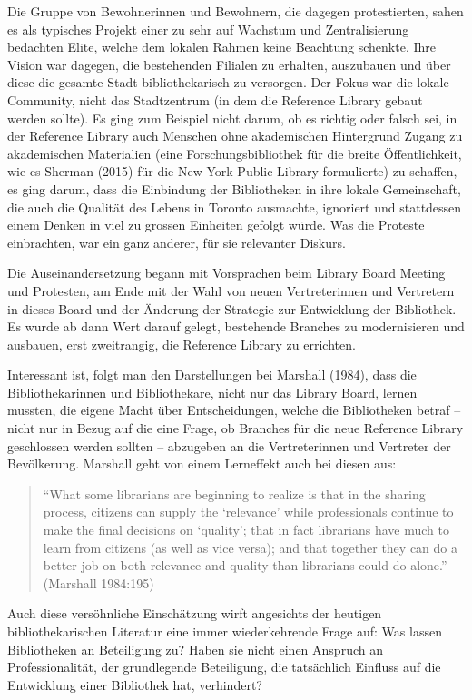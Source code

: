 \documentclass[a4paper,
fontsize=11pt,
oneside,
numbers=noperiodatend,
parskip=half-,
bibliography=totoc,
final
]{scrartcl}
\begin{document}
Die Gruppe von Bewohnerinnen und Bewohnern, die dagegen protestierten,
sahen es als typisches Projekt einer zu sehr auf Wachstum und
Zentralisierung bedachten Elite, welche dem lokalen Rahmen keine
Beachtung schenkte. Ihre Vision war dagegen, die bestehenden Filialen zu
erhalten, auszubauen und über diese die gesamte Stadt bibliothekarisch
zu versorgen. Der Fokus war die lokale Community, nicht das Stadtzentrum
(in dem die Reference Library gebaut werden sollte). Es ging zum
Beispiel nicht darum, ob es richtig oder falsch sei, in der Reference
Library auch Menschen ohne akademischen Hintergrund Zugang zu
akademischen Materialien (eine Forschungsbibliothek für die breite
Öffentlichkeit, wie es Sherman (2015) für die New York Public Library
formulierte) zu schaffen, es ging darum, dass die Einbindung der
Bibliotheken in ihre lokale Gemeinschaft, die auch die Qualität des
Lebens in Toronto ausmachte, ignoriert und stattdessen einem Denken in
viel zu grossen Einheiten gefolgt würde. Was die Proteste einbrachten,
war ein ganz anderer, für sie relevanter Diskurs.

Die Auseinandersetzung begann mit Vorsprachen beim Library Board Meeting
und Protesten, am Ende mit der Wahl von neuen Vertreterinnen und
Vertretern in dieses Board und der Änderung der Strategie zur
Entwicklung der Bibliothek. Es wurde ab dann Wert darauf gelegt,
bestehende Branches zu modernisieren und ausbauen, erst zweitrangig, die
Reference Library zu errichten.

Interessant ist, folgt man den Darstellungen bei Marshall (1984), dass
die Bibliothekarinnen und Bibliothekare, nicht nur das Library Board,
lernen mussten, die eigene Macht über Entscheidungen, welche die
Bibliotheken betraf -- nicht nur in Bezug auf die eine Frage, ob
Branches für die neue Reference Library geschlossen werden sollten --
abzugeben an die Vertreterinnen und Vertreter der Bevölkerung. Marshall
geht von einem Lerneffekt auch bei diesen aus:

\begin{quote}
\enquote{What some librarians are beginning to realize is that in the
sharing process, citizens can supply the \enquote{relevance} while
professionals continue to make the final decisions on \enquote{quality};
that in fact librarians have much to learn from citizens (as well as
vice versa); and that together they can do a better job on both
relevance and quality than librarians could do alone.} (Marshall
1984:195)
\end{quote}

Auch diese versöhnliche Einschätzung wirft angesichts der heutigen
bibliothekarischen Literatur eine immer wiederkehrende Frage auf: Was
lassen Bibliotheken an Beteiligung zu? Haben sie nicht einen Anspruch an
Professionalität, der grundlegende Beteiligung, die tatsächlich Einfluss
auf die Entwicklung einer Bibliothek hat, verhindert?
\end{document}
